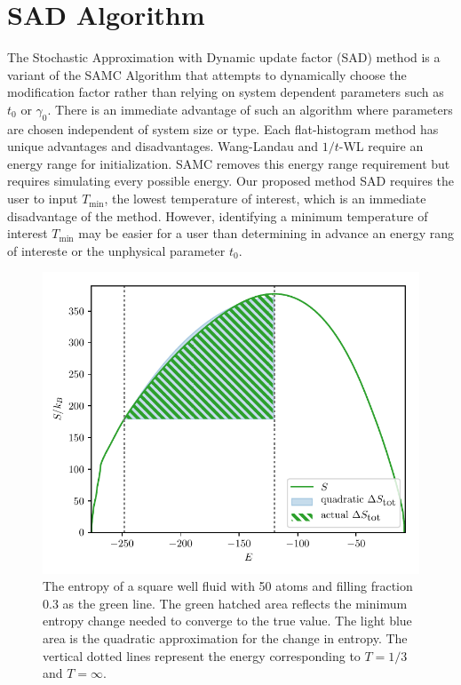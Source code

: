 \documentclass[letterpaper,twocolumn,amsmath,amssymb,pre,aps,10pt]{revtex4-1}
\begin{document}
\section{SAD Algorithm}\label{sec:sad}
The Stochastic Approximation with Dynamic update factor (SAD) method
is a variant of the SAMC Algorithm that attempts to dynamically choose
the modification factor rather than relying on system dependent
parameters such as $t_0$ or $\gamma_0$.  There is an immediate
advantage of such an algorithm where parameters are chosen independent
of system size or type. Each flat-histogram method has unique
advantages and disadvantages.  Wang-Landau and $1/t$-WL require an
energy range for initialization.  SAMC removes this energy range
requirement but requires simulating every possible energy. Our
proposed method SAD requires the user to input $T_\text{min}$, the
lowest temperature of interest, which is an immediate disadvantage of
the method. However, identifying a minimum temperature of interest
$T_\text{min}$ may be easier for a user than determining in advance
an energy rang of intereste or the unphysical parameter $t_0$.

\begin{figure}
  \includegraphics[width=\columnwidth]{figs/N50-lndos-comparison}
  \caption{The entropy of a square well fluid with 50 atoms and filling fraction
        0.3 as the green line.  The green hatched area reflects the
        minimum entropy change needed to converge to the true value.
        The light blue area is the quadratic approximation
        for the change in entropy.  The vertical dotted lines represent
        the energy corresponding to $T=1/3$ and $T=\infty$.}
  \label{fig:entropy-cartoon}
\end{figure}
\end{document}
